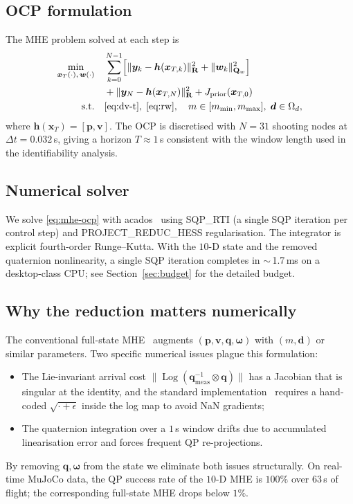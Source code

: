 \documentclass[lettersize,journal]{IEEEtran}
\DeclareMathOperator{\Logm}{Log}
\newcommand{\vect}[1]{\bm{#1}}
\newcommand{\mat}[1]{\mathbf{#1}}
\newcommand{\dt}{\Delta t}
\begin{document}
\subsection{OCP formulation}
The MHE problem solved at each step is
\begin{align}
\min_{\vect x_T(\cdot),\,\vect w(\cdot)}\quad
& \sum_{k=0}^{N-1}\!\Big[\|\vect y_k-\vect h(\vect x_{T,k})\|_{\mat R}^2 + \|\vect w_k\|_{\mat Q_w}^2\Big] \nonumber\\
& {} + \|\vect y_N-\vect h(\vect x_{T,N})\|_{\mat R}^2 + J_{\text{prior}}(\vect x_{T,0}) \nonumber\\
\text{s.t.}\quad
& \eqref{eq:dv-t},\;\eqref{eq:rw},\quad
m\in[m_{\min},m_{\max}],\;\vect d\in\Omega_d,
\label{eq:mhe-ocp}
\end{align}
where $\vect h(\vect x_T)=[\vect p,\vect v]$.  The OCP is
discretised with $N=31$ shooting nodes at $\dt=0.032$\,s, giving
a horizon $T\!\approx\!1$\,s consistent with the window length
used in the identifiability analysis.

\subsection{Numerical solver}
We solve \eqref{eq:mhe-ocp} with acados~\cite{verschueren2022acados}
using SQP\_RTI (a single SQP iteration per control step) and
PROJECT\_REDUC\_HESS regularisation.  The integrator is explicit
fourth-order Runge--Kutta.  With the $10$-D state and the
removed quaternion nonlinearity, a single SQP iteration completes
in $\sim$\,1.7\,ms on a desktop-class CPU; see
Section~\ref{sec:budget} for the detailed budget.

\subsection{Why the reduction matters numerically}
The conventional full-state MHE~\cite{liu2023nonlinear,kabzan2019learning}
augments $(\vect p,\vect v,\vect q,\vect\omega)$ with $(m,\vect d)$
or similar parameters.  Two specific numerical issues plague
this formulation:
\begin{itemize}
\item The Lie-invariant arrival cost
$\|\!\Logm(\vect q_{\text{meas}}^{-1}\otimes \vect q)\!\|$ has a
Jacobian that is singular at the identity, and the standard
implementation~\cite{forster2015imu} requires a hand-coded
$\sqrt{\cdot+\epsilon}$ inside the log map to avoid NaN
gradients;
\item The quaternion integration over a $1$\,s window drifts due
to accumulated linearisation error and forces frequent QP
re-projections.
\end{itemize}
By removing $\vect q,\vect\omega$ from the state we eliminate
both issues structurally.  On real-time MuJoCo data, the QP
success rate of the $10$-D MHE is $100\%$ over $63$\,s of
flight; the corresponding full-state MHE drops below $1\%$.
\end{document}
